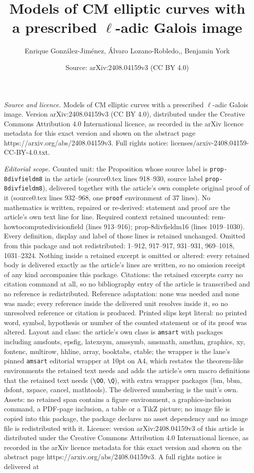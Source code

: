 \documentclass[10pt,a4paper]{amsart}
\title[Models of CM elliptic curves with a prescribed $\ell$-adic G]{Models of CM elliptic curves with a prescribed $\ell$-adic Galois image}
\author{Enrique Gonz\'alez-Jim\'enez, \'Alvaro Lozano-Robledo,, Benjamin York}
\date{Source: arXiv:2408.04159v3 (CC BY 4.0)}
\begin{document}
\maketitle

\noindent\emph{Source and licence.} Models of CM elliptic curves with a prescribed $\ell$-adic Galois image. Version arXiv:2408.04159v3 (CC BY 4.0), distributed under the Creative Commons Attribution 4.0 International licence, as recorded in the arXiv licence metadata for this exact version and shown on the abstract page https://arxiv.org/abs/2408.04159v3. Full rights notice: licenses/arxiv-2408.04159-CC-BY-4.0.txt.\par\smallskip

\noindent\textit{Editorial scope.} Counted unit: the Proposition whose source label is \texttt{prop-8divfieldm8} in the article (source0.tex lines 918--930, source label \texttt{prop-8divfieldm8}), delivered together with the article's own complete original proof of it (source0.tex lines 932--968, one \texttt{proof} environment of 37 lines). No mathematics is written, repaired or re-derived: statement and proof are the article's own text line for line. Required context retained uncounted: rem-howtocomputedivisionfield (lines 913--916); prop-8divfieldm16 (lines 1019--1030). Every definition, display and label of those lines is retained unchanged. Omitted from this package and not redistributed: 1--912, 917--917, 931--931, 969--1018, 1031--2324. Nothing inside a retained excerpt is omitted or altered: every retained body is delivered exactly as the article's lines are written, so no omission receipt of any kind accompanies this package. Citations: the retained excerpts carry no citation command at all, so no bibliography entry of the article is transcribed and no reference is redistributed. Reference adaptation: none was needed and none was made; every reference inside the delivered unit resolves inside it, so no unresolved reference or citation is produced. Printed slips kept literal: no printed word, symbol, hypothesis or number of the counted statement or of its proof was altered. Layout and class: the article's own class is \texttt{amsart} with packages including amsfonts, epsfig, latexsym, amssymb, amsmath, amsthm, graphics, xy, fontenc, multirow, hhline, array, booktabs, ctable; the wrapper is the lane's pinned \texttt{amsart} editorial wrapper at 10pt on A4, which restates the theorem-like environments the retained text needs and adds the article's own macro definitions that the retained text needs (\texttt{\textbackslash OO}, \texttt{\textbackslash Q}), with extra wrapper packages (bm, bbm, dsfont, xspace, cancel, mathtools). The delivered numbering is the unit's own. Assets: no retained span contains a figure environment, a graphics-inclusion command, a PDF-page inclusion, a table or a TikZ picture; no image file is copied into this package, the package declares no asset dependency and no image file is redistributed with it. Licence: version arXiv:2408.04159v3 of this article is distributed under the Creative Commons Attribution 4.0 International licence, as recorded in the arXiv licence metadata for this exact version and shown on the abstract page https://arxiv.org/abs/2408.04159v3. A full rights notice is delivered at 
\end{document}
